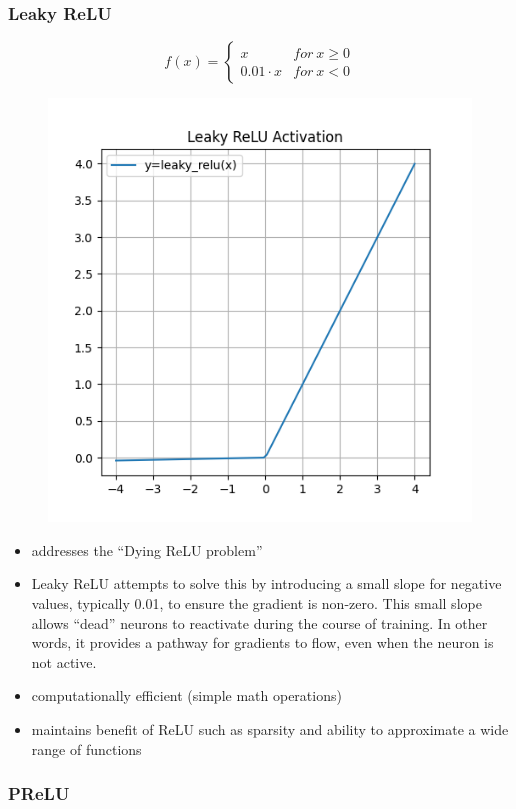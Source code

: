 \documentclass[11pt]{article}
\begin{document}
\subsubsection{Leaky ReLU}

\begin{definition}\label{eq:activation-leaky-relu}
    \begin{equation*}
        f(x) = \begin{cases}
            x & for \ x \geq 0 \\ 
            0.01 \cdot x & for \ x < 0
        \end{cases}
    \end{equation*}
\end{definition}

\begin{figure}[H]
    \centering
    \includegraphics*[width=.4\linewidth]{figures/Leaky ReLU Activation.png}\label{fig:leaky-relu}
\end{figure}

\begin{itemize}
    \item addresses the ``Dying ReLU problem''
    \item Leaky ReLU attempts to solve this by introducing a small slope for negative values, typically 0.01, to ensure the gradient is non-zero. This small slope allows ``dead'' neurons to reactivate during the course of training. In other words, it provides a pathway for gradients to flow, even when the neuron is not active.
    \item computationally efficient (simple math operations)
    \item maintains benefit of ReLU such as sparsity and ability to approximate a wide range of functions
\end{itemize}

\subsubsection{PReLU}
\end{document}
